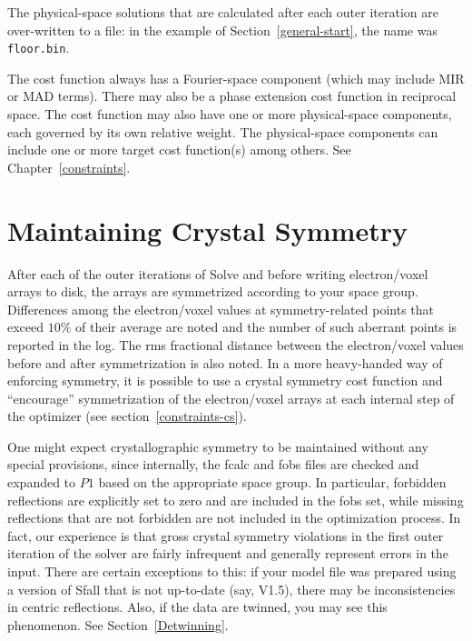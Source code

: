 \documentclass{report}
\begin{document}
\vspace {0.1in}

The physical-space solutions that are calculated 
after each outer iteration are over-written to a file: in 
the example of Section~\ref{general-start}, the name was {\tt floor.bin}.

\vspace {0.1in}

The cost function always has a Fourier-space component (which may include
MIR or MAD terms).  There may also be a phase extension cost 
function in reciprocal space.
The cost function may also have one or more 
physical-space components, 
each governed by its own relative weight.
The physical-space components can include one or more target cost function(s)
among others.  See Chapter~\ref{constraints}.

\section {Maintaining Crystal Symmetry}
\label{solver-symmetry}

After each of the outer iterations of Solve and before writing electron/voxel
arrays to disk, the arrays are symmetrized according to your
space group.  Differences among the electron/voxel values at 
symmetry-related points that exceed $10\%$ of their 
average are noted and the number of such aberrant points is reported in
the log.  The rms fractional distance between the electron/voxel values before 
and after symmetrization is also noted.  
In a more heavy-handed way of enforcing symmetry, 
it is possible to use a crystal symmetry cost function 
and ``encourage'' symmetrization of the 
electron/voxel arrays at each internal step of the optimizer (see 
section~\ref{constraints-cs}).

\vspace {0.1in}

One might expect crystallographic symmetry to be maintained without any special
provisions, since internally, the fcalc and fobs files are checked and expanded
to $P1$ based on the appropriate space group.  In particular, forbidden
reflections are explicitly set to zero and are included in the fobs set,
while missing reflections that are not forbidden are not included in
the optimization process.  In fact, our experience is that gross crystal 
symmetry violations in the first outer iteration of the solver are fairly 
infrequent and generally represent errors in the input.
There are certain exceptions to this: if your model file was prepared 
using a version of Sfall that is not up-to-date (say, V1.5), there may be 
inconsistencies in centric reflections.  Also, if the data are twinned, you
may see this phenomenon.  See Section~\ref{Detwinning}.
\end{document}
